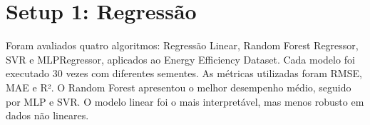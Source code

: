 \section{Setup 1: Regressão}
Foram avaliados quatro algoritmos: Regressão Linear, Random Forest Regressor, SVR e MLPRegressor, aplicados ao Energy Efficiency Dataset. Cada modelo foi executado 30 vezes com diferentes sementes. As métricas utilizadas foram RMSE, MAE e R². O Random Forest apresentou o melhor desempenho médio, seguido por MLP e SVR. O modelo linear foi o mais interpretável, mas menos robusto em dados não lineares.
